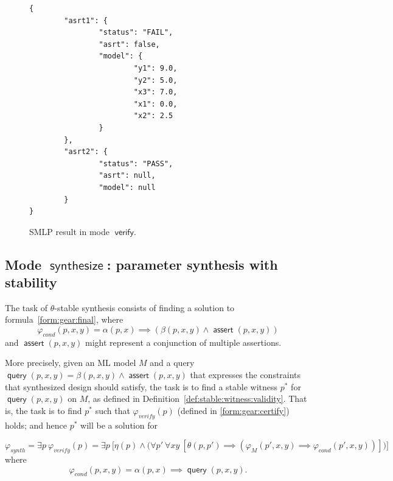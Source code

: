 \documentclass[a4paper,parskip=half]{article} %
\newcommand*\eqdef=
\newcommand*\query{\operatorname{\mathsf{query}}}
\newcommand*\assert{\operatorname{\mathsf{assert}}}
\newcommand*\mode[1]{\operatorname{\mathsf{#1}}} %
\begin{document}
\begin{figure}
\small
\begin{verbatim}
{
        "asrt1": {
                "status": "FAIL",
                "asrt": false,
                "model": {
                        "y1": 9.0,
                        "y2": 5.0,
                        "x3": 7.0,
                        "x1": 0.0,
                        "x2": 2.5
                }
        },
        "asrt2": {
                "status": "PASS",
                "asrt": null,
                "model": null
        }
}

\end{verbatim}
\caption{SMLP result in mode $\mode{verify.}$}\label{fig:verify:result}
\end{figure}


\subsection{Mode $\mode{synthesize}$: parameter synthesis with stability}


The task of $\theta$-stable synthesis consists of finding a solution to formula~\cref{form:gear:final}, where
\[\varphi_{\mathit{cond}}(p,x,y) \eqdef \alpha(p,x) \implies (\beta(p, x, y) \wedge \assert(p,x,y))\]
and  $\assert(p, x, y)$ might represent a conjunction of multiple assertions.



More precisely, given an ML model $M$  and a query $\query(p, x, y)\eqdef \beta(p, x, y) \wedge \assert(p,x,y)$ 
that expresses the constraints that synthesized
design should satisfy,  the task is to find a stable witness $p^*$  for $\query(p, x, y)$ on $M$, as defined in 
Definition~\ref{def:stable:witness:validity}. 
That is, the task is to find $p^*$ such that $\varphi_{\mathit{verify}}(p)$ (defined in \cref{form:gear:certify}) holds;  
and hence $p^*$ will be a solution for 

\begin{equation}\label{form:gear:query:candidate}
\varphi_{\mathit{synth}} \eqdef \exists p~\varphi_{\mathit{verify}}(p)  \eqdef \exists p~ \big[ \eta(p) \wedge \big(
    \forall p'~
    \forall x y~[
   \theta(p, p') \implies (\varphi_M(p',x,y)  \implies  \varphi_{\mathit{cond}}(p',x,y))
    ]\big)\big]
\end{equation}
where \[\varphi_{\mathit{cond}}(p,x,y) \eqdef \alpha(p,x) \implies \query(p,x,y).\]
\end{document}
